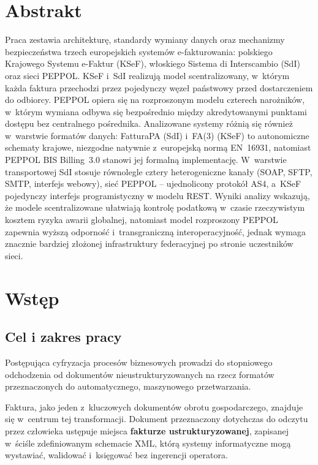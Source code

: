 \section{Abstrakt}
\label{sec:abstrakt}

Praca zestawia architekturę, standardy wymiany danych oraz mechanizmy bezpieczeństwa trzech europejskich systemów e-fakturowania: polskiego Krajowego Systemu e-Faktur (KSeF), włoskiego Sistema di Interscambio (SdI) oraz sieci PEPPOL. KSeF i~SdI realizują model scentralizowany, w~którym każda faktura przechodzi przez pojedynczy węzeł państwowy przed dostarczeniem do odbiorcy. PEPPOL opiera się na rozproszonym modelu czterech narożników, w~którym wymiana odbywa się bezpośrednio między akredytowanymi punktami dostępu bez centralnego pośrednika. Analizowane systemy różnią się również w~warstwie formatów danych: FatturaPA (SdI) i~FA(3) (KSeF) to autonomiczne schematy krajowe, niezgodne natywnie z~europejską normą EN~16931, natomiast PEPPOL BIS Billing~3.0 stanowi jej formalną implementację. W~warstwie transportowej SdI stosuje równolegle cztery heterogeniczne kanały (SOAP, SFTP, SMTP, interfejs webowy), sieć PEPPOL -- ujednolicony protokół AS4, a~KSeF pojedynczy interfejs programistyczny w modelu REST. Wyniki analizy wskazują, że modele scentralizowane ułatwiają kontrolę podatkową w~czasie rzeczywistym kosztem ryzyka awarii globalnej, natomiast model rozproszony PEPPOL zapewnia wyższą odporność i~transgraniczną interoperacyjność, jednak wymaga znacznie bardziej złożonej infrastruktury federacyjnej po stronie uczestników sieci.

\section{Wstęp}
\label{sec:wstep}

\subsection{Cel i zakres pracy}
\label{sec:wstep-cel}

Postępująca cyfryzacja procesów biznesowych prowadzi do stopniowego odchodzenia od dokumentów nieustrukturyzowanych na rzecz formatów przeznaczonych do automatycznego, maszynowego przetwarzania. 

Faktura, jako jeden z~kluczowych dokumentów obrotu gospodarczego, znajduje się w~centrum tej transformacji. Dokument przeznaczony dotychczas do odczytu przez człowieka ustępuje miejsca \textbf{fakturze ustrukturyzowanej}, zapisanej w~ściśle zdefiniowanym schemacie XML, którą systemy informatyczne mogą wystawiać, walidować i~księgować bez ingerencji operatora.

